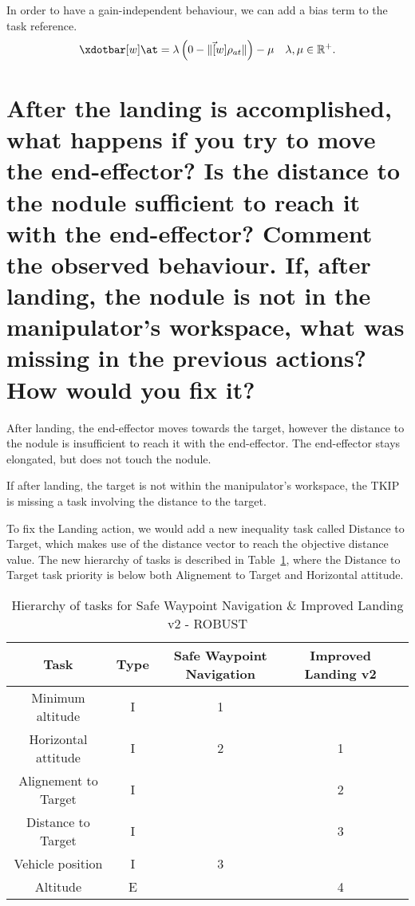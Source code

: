 \begin{parts}
\begin{solutionorbox}
		In order to have a gain-independent behaviour, we can add a bias term
		to the task reference.
		\[
			\xdotbar[w]\at =
			\lambda\left(0 - \lVert\vec[w]{\rho_{at}}\rVert\right) -
			\mu\quad
			\lambda,\mu\in\mathbb{R}^+
			\mathrm{.}
		\]
	\end{solutionorbox}

	\part{After the landing is accomplished, what happens if you try
		to move the end-effector? Is the distance to the nodule sufficient to reach it
		with the end-effector? Comment the observed behaviour. If, after landing, the
		nodule is not in the manipulator's workspace, what was missing in the previous
	actions? How would you fix it?}

	\begin{solutionorbox}
		After landing, the end-effector moves towards the target,
		however the distance to the nodule is insufficient to reach it
		with the end-effector. The end-effector stays elongated, but
		does not touch the nodule.

		If after landing, the target is not within the manipulator's
		workspace, the TKIP is missing a task involving the distance to
		the target.

		To fix the Landing action, we would add a new inequality task
		called Distance to Target, which makes use of the distance
		vector  to reach the objective distance value. The
		new hierarchy of tasks is described in
		Table~\ref{table:tkip_swn_improved_landing_v2_robust}, where the
		Distance to Target task priority is below both Alignement to
		Target and Horizontal attitude.
	\end{solutionorbox}
	\begin{table}[htb]
		\caption{Hierarchy of tasks for Safe Waypoint Navigation \&
		Improved Landing v2 - ROBUST}
		\label{table:tkip_swn_improved_landing_v2_robust}
		\begin{center}
			\footnotesize
			\begin{tabular}{ccccc}
				\toprule
				Task & Type & Safe Waypoint Navigation &
				Improved Landing v2
				\\
				\midrule
				Minimum altitude & I & 1 & \\
				\hdashline
				Horizontal attitude & I & 2 & 1\\
				\hdashline
				Alignement to Target & I & & 2\\
				\hdashline
				Distance to Target & I & & 3\\
				\hdashline
				Vehicle position & I & 3 & \\
				\hdashline
				Altitude & E &  & 4\\
				\bottomrule
			\end{tabular}
		\end{center}
	\end{table}%
\end{parts}
